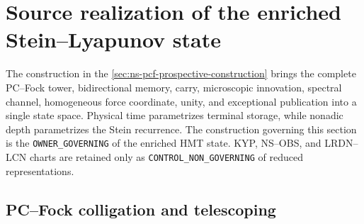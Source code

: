 \section{Source realization of the enriched Stein--Lyapunov state}
\label{sec:ns-owner-closure}

The construction in the \cref{sec:ns-pcf-prospective-construction} brings the complete PC--Fock tower, bidirectional memory, carry, microscopic innovation, spectral channel, homogeneous force coordinate, unity, and exceptional publication into a single state space. Physical time parametrizes terminal storage, while nonadic depth parametrizes the Stein recurrence. The construction governing this section is the \texttt{OWNER\_GOVERNING} of the enriched HMT state. KYP, NS--OBS, and LRDN--LCN charts are retained only as \texttt{CONTROL\_NON\_GOVERNING} of reduced representations.

\subsection{PC--Fock colligation and telescoping}

